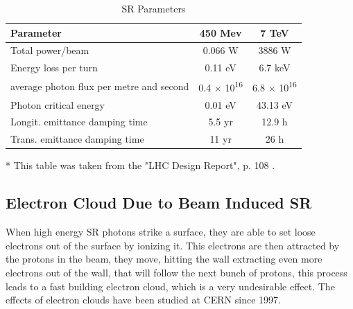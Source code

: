 \begin{table}%
\caption{SR Parameters} %
\begin{minipage}{\textwidth}
\begin{tabular}{l c c}%
\hline
\hline %
Parameter & 450 Mev & 7 TeV \\[0.5ex]%
\hline %
Total power/beam & 0.066 W & 3886 W \\ %
Energy loss per turn & 0.11 eV & 6.7 keV \\
average photon flux per metre and second & 0.4 $\times$ 10\textsuperscript{16} & 6.8 $\times$ 10\textsuperscript{16} \\
Photon critical energy & 0.01 eV & 43.13 eV \\
Longit. emittance damping time & 5.5 yr & 12.9 h \\
Trans. emittance damping time & 11 yr & 26 h \\ [1ex] %
\hline %
\end{tabular}
\end{minipage}
\begin{minipage}{\textwidth}
\begin{footnotesize}
* This table was taken from the "LHC Design Report", p. 108 \citep{DR}.
\end{footnotesize}
\end{minipage}
\label{table:LHCSR} %
\end{table}



\subsection{Electron Cloud Due to Beam Induced SR}

When high energy SR photons strike a surface, they are able to set loose
electrons out of the surface by ionizing it. This electrons are then attracted
by the protons in the beam, they move, hitting the wall extracting even more
electrons out of the wall, that will follow the next bunch of protons, this
process leads to a fast building electron cloud, which is a very undesirable
effect. The effects of electron clouds have been studied at CERN since
1997\cite{rumolo2011electron}.


